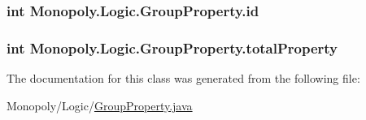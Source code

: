 \subsubsection[{\texorpdfstring{id}{id}}]{\setlength{\rightskip}{0pt plus 5cm}int Monopoly.\+Logic.\+Group\+Property.\+id\hspace{0.3cm}{\ttfamily [private]}}\hypertarget{class_monopoly_1_1_logic_1_1_group_property_ae78e270b84f150cbd7ba6dfd73796d37}{}\label{class_monopoly_1_1_logic_1_1_group_property_ae78e270b84f150cbd7ba6dfd73796d37}
\subsubsection[{\texorpdfstring{total\+Property}{totalProperty}}]{\setlength{\rightskip}{0pt plus 5cm}int Monopoly.\+Logic.\+Group\+Property.\+total\+Property\hspace{0.3cm}{\ttfamily [private]}}\hypertarget{class_monopoly_1_1_logic_1_1_group_property_a1539ca57fe37b36bc493f8f37c4b946d}{}\label{class_monopoly_1_1_logic_1_1_group_property_a1539ca57fe37b36bc493f8f37c4b946d}


The documentation for this class was generated from the following file\+:\begin{DoxyCompactItemize}
\item 
Monopoly/\+Logic/\hyperlink{_group_property_8java}{Group\+Property.\+java}\end{DoxyCompactItemize}
